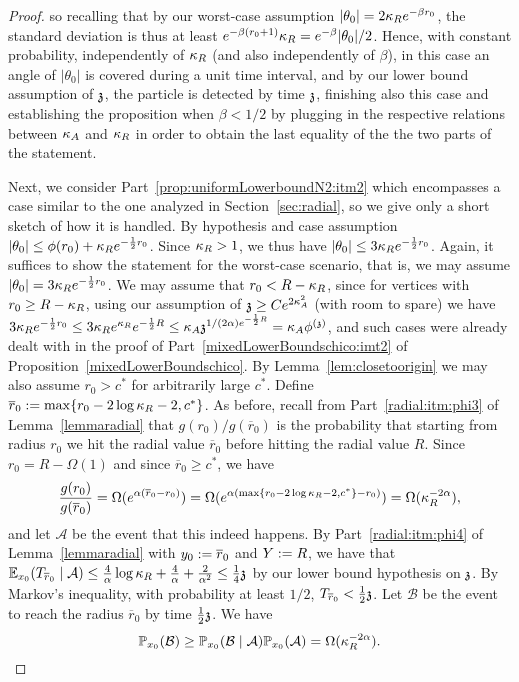 \begin{proof}
so recalling that by our worst-case assumption $|\theta_0|=2\KR e^{-\beta r_0}$,  the standard deviation is thus at least $e^{-\beta (r_0+1)}\KR=e^{-\beta}|\theta_0|/2$. Hence, with constant probability, independently of $\KR$ (and also independently of $\beta$), in this case an angle of $|\theta_0|$ is covered during a unit time interval, and by our lower bound assumption of $\ss$, the particle is detected by time $\ss$, finishing also this case and %
establishing the proposition when $\beta<1/2$ 
by plugging in the respective relations between $\KA$ and $\KR$ in order to obtain the last equality of the the two parts of the statement.

Next, we consider Part~\eqref{prop:uniformLowerboundN2:itm2} which encompasses a case similar to the one analyzed in Section~\ref{sec:radial}, so we give only a short sketch of how it is handled. By hypothesis and case assumption $|\theta_0| \le \phi(r_0)+\KR e^{-\frac12r_0}$. Since $\KR >1$, we thus have $|\theta_0|\le 3\KR e^{-\frac12r_0}$. Again, it suffices to show the statement for the worst-case scenario, that is, we may assume $|\theta_0|= 3\KR e^{-\frac12r_0}$. We may assume that $r_0 < R- \KR$, since for vertices with $r_0 \ge R-\KR$, using our assumption of $\ss\ge Ce^{2\KA^2}$ (with room to spare) we have
$3\KR e^{-\frac12r_0} \le 3\KR e^{\KR} e^{-\frac12 R} \le \KA \ss^{1/(2\alpha) e^{-\frac12 R}}=\KA \phis$, and such cases were already dealt with in the proof of Part~\eqref{mixedLowerBoundschico:imt2}  of Proposition~\ref{mixedLowerBoundschico}. By Lemma~\ref{lem:closetoorigin} we may also assume $r_0 > c^*$ for arbitrarily large $c^*$.
Define $\overline{r}_0:=\max\{r_0-2 \log \KR-2, c^{*}\}$. 
As before, recall from Part~\eqref{radial:itm:phi3} of Lemma~\ref{lemmaradial} that $g(r_0)/g(\overline{r}_0)$ is the probability that starting from radius $r_0$ we hit the radial value $\overline{r}_0$ before hitting the radial value $R$. Since $r_0=R-\Omega(1)$ and since $\overline{r}_0 \ge c^*$, we have
$$
\frac{g(r_0)}{g(\overline{r}_0)}=\Omega(e^{\alpha(\overline{r}_0-r_0)})=
\Omega(e^{\alpha(\max\{r_0-2\log \KR-2, c^*\}-r_0)})=\Omega(\KR^{-2\alpha}),
$$
and let $\mathcal{A}$ be the event that this indeed happens. 
By Part~\eqref{radial:itm:phi4} of Lemma~\ref{lemmaradial} with $\auxy_0:=\overline{r}_0$ and $\auxY:=R$, we have that $\EE_{x_0}(T_{\overline{r}_0}\mid \mathcal{A}) \le \frac{4}{\alpha}\log \KR +\frac{4}{\alpha}+ \frac{2}{\alpha^2} \le \frac14\ss$ by our lower bound hypothesis on $\ss$. By Markov's inequality, with probability at least $1/2$, $T_{\overline{r}_0} < \frac12\ss$. Let $\mathcal{B}$ be the event to reach the radius $\overline{r}_0$ by time $\frac12\ss$.
We have
$$
\PP_{x_0}(\mathcal{B}) \ge \PP_{x_0}(\mathcal{B} \mid \mathcal{A})\PP_{x_0}(\mathcal{A}) =\Omega(\KR^{-2\alpha}).
$$


\end{proof}
